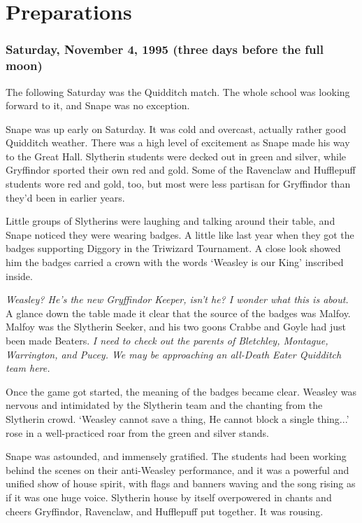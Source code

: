 
\chapter{Preparations}

\subsection{Saturday, November 4, 1995 (three days before the full moon)}

The following Saturday was the Quidditch match. The whole school was looking forward to it, and Snape was no exception.

Snape was up early on Saturday. It was cold and overcast, actually rather good Quidditch weather. There was a high level of excitement as Snape made his way to the Great Hall. Slytherin students were decked out in green and silver, while Gryffindor sported their own red and gold. Some of the Ravenclaw and Hufflepuff students wore red and gold, too, but most were less partisan for Gryffindor than they'd been in earlier years.

Little groups of Slytherins were laughing and talking around their table, and Snape noticed they were wearing badges. A little like last year when they got the badges supporting Diggory in the Triwizard Tournament. A close look showed him the badges carried a crown with the words `Weasley is our King' inscribed inside.

\emph{Weasley? He's the new Gryffindor Keeper, isn't he? I wonder what this is about.} A glance down the table made it clear that the source of the badges was Malfoy. Malfoy was the Slytherin Seeker, and his two goons Crabbe and Goyle had just been made Beaters. \emph{I need to check out the parents of Bletchley, Montague, Warrington, and Pucey. We may be approaching an all-Death Eater Quidditch team here.}

Once the game got started, the meaning of the badges became clear. Weasley was nervous and intimidated by the Slytherin team and the chanting from the Slytherin crowd. `Weasley cannot save a thing, He cannot block a single thing...' rose in a well-practiced roar from the green and silver stands.

Snape was astounded, and immensely gratified. The students had been working behind the scenes on their anti-Weasley performance, and it was a powerful and unified show of house spirit, with flags and banners waving and the song rising as if it was one huge voice. Slytherin house by itself overpowered in chants and cheers Gryffindor, Ravenclaw, and Hufflepuff put together. It was rousing.

